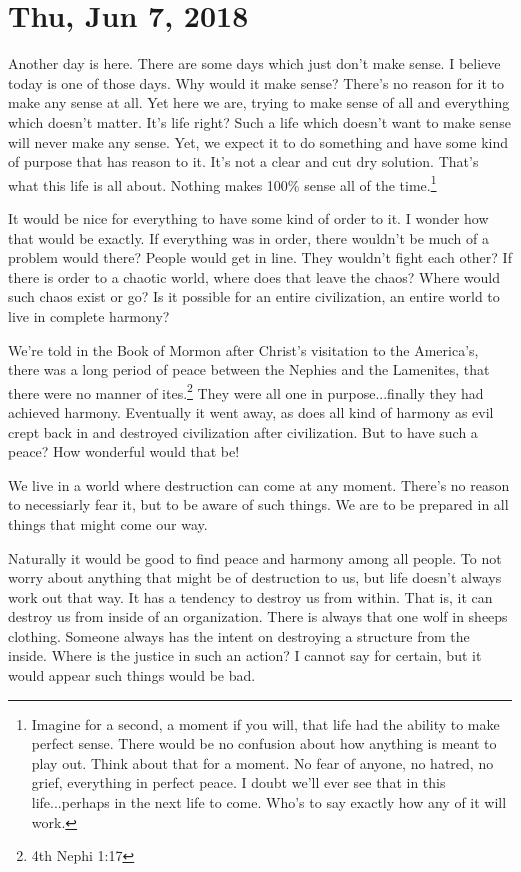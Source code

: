 \section{Thu, Jun 7, 2018}

Another day is here. There are some days which just don't make sense. I believe
today is one of those days. Why would it make sense? There's no reason for it to
make any sense at all. Yet here we are, trying to make sense of all and
everything which doesn't matter. It's life right? Such a life which doesn't want
to make sense will never make any sense. Yet, we expect it to do something and
have some kind of purpose that has reason to it. It's not a clear and cut dry
solution. That's what this life is all about. Nothing makes 100\% sense all of
the time.\footnote{Imagine for a second, a moment if you will, that life had
the ability to make perfect sense. There would be no confusion about how 
anything is meant to play out. Think about that for a moment. No fear of anyone,
no hatred, no grief, everything in perfect peace. I doubt we'll ever see that
in this life...perhaps in the next life to come. Who's to say exactly how any
of it will work.}

It would be nice for everything to have some kind of order to it. I wonder how
that would be exactly. If everything was in order, there wouldn't be much of a
problem would there? People would get in line. They wouldn't fight each other?
If there is order to a chaotic world, where does that leave the chaos? Where
would such chaos exist or go? Is it possible for an entire civilization, an
entire world to live in complete harmony?

We're told in the Book of Mormon after Christ's visitation to the America's,
there was a long period of peace between the Nephies and the Lamenites, that
there were no manner of ites.\footnote{4th Nephi 1:17} They were all one in 
purpose...finally they had achieved harmony. Eventually it went away, as does 
all kind of harmony as evil crept back in and destroyed civilization after 
civilization. But to have such a peace? How wonderful would that be!

We live in a world where destruction can come at any moment. There's no reason
to necessiarly fear it, but to be aware of such things. We are to be prepared in
all things that might come our way.

Naturally it would be good to find peace and harmony among all people. To not
worry about anything that might be of destruction to us, but life doesn't always
work out that way. It has a tendency to destroy us from within. That is, it can
destroy us from inside of an organization. There is always that one wolf in
sheeps clothing. Someone always has the intent on destroying a structure from 
the inside. Where is the justice in such an action? I cannot say for certain,
but it would appear such things would be bad.
